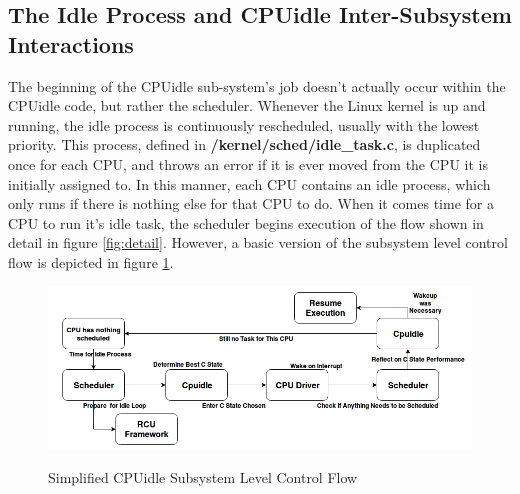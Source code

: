\documentclass[10pt,preprint]{sigplanconf}
\begin{document}
   \subsection{The Idle Process and CPUidle Inter-Subsystem Interactions}
   The beginning of the CPUidle sub-system's job doesn't actually occur within the CPUidle code, but rather the scheduler. Whenever the Linux kernel is up and running, the idle process is continuously rescheduled, usually with the lowest priority. This process, defined in \textbf{/kernel/sched/idle\_task.c}, is duplicated once for each CPU, and throws an error if it is ever moved from the CPU it is initially assigned to. In this manner, each CPU contains an idle process, which only runs if there is nothing else for that CPU to do. When it comes time for a CPU to run it’s idle task, the scheduler begins execution of the flow shown in detail in figure \ref{fig:detail}. However, a basic version of the subsystem level control flow is depicted in figure \ref{fig:simple}.
   
    \begin{figure}[h]
    \caption{Simplified CPUidle Subsystem Level Control Flow}
    \centering
    \includegraphics[width=\columnwidth]{Idle_Flow_Simple}
    \label{fig:simple}
    \end{figure}
    
\end{document}
